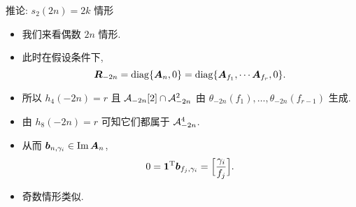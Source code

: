 \documentclass[handout,aspectratio=169]{ctexbeamer}
\renewcommand\aleg[2]{\Bigl[\dfrac{{#1}}{#2}\Bigr]}
\begin{document}
\begin{frame}{推论: $s_2(2n)=2k$ 情形}
	\begin{itemize}
		\item 我们来看偶数 $2n$ 情形.
		\item 此时在假设条件下,
		\[
			{\boldsymbol{R}}_{-2n}={\mathrm{diag}}\{{\boldsymbol{A}}_n,0\}
			={\mathrm{diag}}\{{\boldsymbol{A}}_{f_1},\cdots {\boldsymbol{A}}_{f_r},0\}.
		\]
		\item 所以 $h_4(-2n)=r$ 且 ${\mathcal{A}}_{-2n}[2]\cap {\mathcal{A}}_{-2n}^2$ 由 $\theta_{-2n}(f_1),\dots,\theta_{-2n}(f_{r-1})$ 生成.
		\item 由 $h_8(-2n)=r$ 可知它们都属于 ${\mathcal{A}}_{-2n}^4$.
		\item 从而 ${\boldsymbol{b}}_{n,\gamma_i}\in\operatorname{Im} {\boldsymbol{A}}_n$, 
		\[
			0={\bf1}^\rmT\bfb_{f_j,\gamma_i}=\aleg{\gamma_i}{f_j}.
		\]
		\item 奇数情形类似.
	\end{itemize}
\end{frame}
\end{document}
